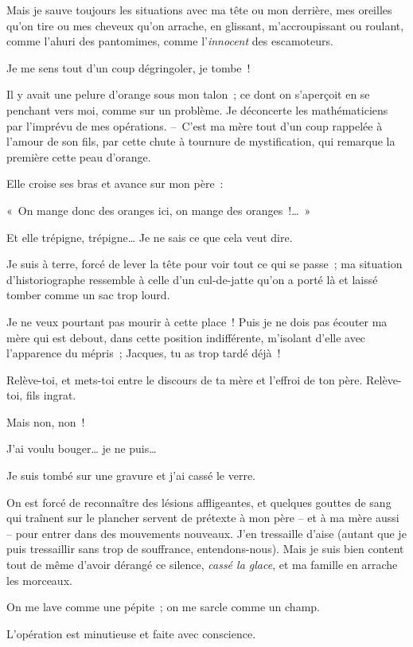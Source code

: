 \documentclass[french,twoside]{book} %
\begin{document}
\noindent Mais je sauve toujours les situations avec ma tête ou mon derrière, mes oreilles qu’on tire ou mes cheveux qu’on arrache, en glissant, m’accroupissant ou roulant, comme l’ahuri des pantomimes, comme l’\emph{innocent} des escamoteurs.\par
Je me sens tout d’un coup dégringoler, je tombe !\par
Il y avait une pelure d’orange sous mon talon ; ce dont on s’aperçoit en se penchant vers moi, comme sur un problème. Je déconcerte les mathématiciens par l’imprévu de mes opérations. – C’est ma mère tout d’un coup rappelée à l’amour de son fils, par cette chute à tournure de mystification, qui remarque la première cette peau d’orange.\par
Elle croise ses bras et avance sur mon père :\par
« On mange donc des oranges ici, on mange des oranges !… »\par
Et elle trépigne, trépigne… Je ne sais ce que cela veut dire.\par
Je suis à terre, forcé de lever la tête pour voir tout ce qui se passe ; ma situation d’historiographe ressemble à celle d’un cul-de-jatte qu’on a porté là et laissé tomber comme un sac trop lourd.\par
Je ne veux pourtant pas mourir à cette place ! Puis je ne dois pas écouter ma mère qui est debout, dans cette position indifférente, m’isolant d’elle avec l’apparence du mépris ; Jacques, tu as trop tardé déjà !\par
Relève-toi, et mets-toi entre le discours de ta mère et l’effroi de ton père. Relève-toi, fils ingrat.\par
Mais non, non !\par
J’ai voulu bouger… je ne puis…\par
Je suis tombé sur une gravure et j’ai cassé le verre.\par
On est forcé de reconnaître des lésions affligeantes, et quelques gouttes de sang qui traînent sur le plancher servent de prétexte à mon père – et à ma mère aussi – pour entrer dans des mouvements nouveaux. J’en tressaille d’aise (autant que je puis tressaillir sans trop de souffrance, entendons-nous). Mais je suis bien content tout de même d’avoir dérangé ce silence, \emph{cassé la glace}, et ma famille en arrache les morceaux.\par
On me lave comme une pépite ; on me sarcle comme un champ.\par
L’opération est minutieuse et faite avec conscience.\par
\end{document}
